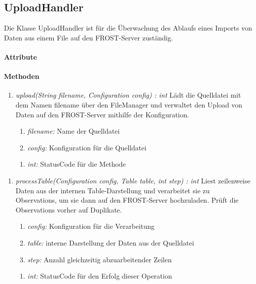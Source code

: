 \subsection{UploadHandler}
\label{uploadHandler}
Die Klasse UploadHandler ist für die Überwachung des Ablaufs eines Imports von Daten aus einem File auf den FROST-Server zuständig.

\paragraph{Attribute}
\paragraph{Methoden}
\begin{enumerate}[+]
\item \textit{upload(String filename, Configuration config) : int}
Lädt die Quelldatei mit dem Namen filename über den FileManager und verwaltet den Upload von Daten auf den FROST-Server mithilfe der Konfiguration.
\begin{enumerate}[$\bullet$]
\item \textit{filename:} Name der Quelldatei
\item \textit{config:} Konfiguration für die Quelldatei 
\end{enumerate}
\vspace{-0.2cm}
\begin{enumerate}[$\circ$]
\item \textit{int:} StatusCode für die Methode
\end{enumerate}
\end{enumerate}

\begin{enumerate}[$-$]
\item \textit{processTable(Configuration config, Table table, int step) : int} Liest zeilenweise Daten aus der internen Table-Darstellung und verarbeitet sie zu Observations, um sie dann auf den FROST-Server hochzuladen. Prüft die Observations vorher auf Duplikate.
\begin{enumerate}[$\bullet$]
\item \textit{config:} Konfiguration für die Verarbeitung
\item \textit{table:} interne Darstellung der Daten aus der Quelldatei
\item \textit{step:} Anzahl gleichzeitig abzuarbeitender Zeilen
\end{enumerate}
\vspace{-0.2cm}
\begin{enumerate}[$\circ$]
\item \textit{int:} StatusCode für den Erfolg dieser Operation
\end{enumerate}
\end{enumerate}